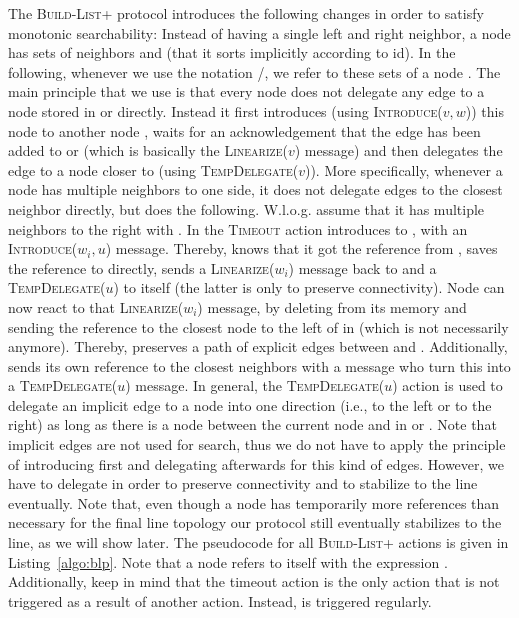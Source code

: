 \documentclass[a4paper,USenglish]{lipics}
\newcommand{\blp}{\textsc{Build-List+}\xspace}
\newcommand{\linearize}[1]{\textsc{Linearize(\ensuremath{#1})}\xspace}
\newcommand{\introduce}[1]{\textsc{Introduce(\ensuremath{#1})}\xspace}
\newcommand{\tempdelegate}[1]{\textsc{TempDelegate(\ensuremath{#1})}\xspace}
\newcommand{\timeout}{\textsc{Timeout}\xspace}
\begin{document}
The \blp protocol introduces the following changes in order to satisfy monotonic searchability:
Instead of having a single left and right neighbor, a node  has sets of neighbors  and  (that it sorts implicitly according to id).
In the following, whenever we use the notation /, we refer to these sets of a node .
The main principle that we use is that every node  does not delegate any edge to a node  stored in  or  directly.
Instead it first introduces (using \introduce{v,w}) this node to another node , waits for an acknowledgement that the edge has been added to  or  (which is basically the \linearize{v} message) and then delegates the edge to a node closer to  (using \tempdelegate{v}).
More specifically, whenever a node  has multiple neighbors to one side, it does not delegate edges to the closest neighbor directly, but does the following.
W.l.o.g. assume that it has multiple neighbors  to the right with .
In the \timeout action  introduces  to , with an \introduce{w_i,u} message.
Thereby,  knows that it got the reference from , saves the reference to  directly, sends a \linearize{w_i} message back to  and a \tempdelegate{u} to itself (the latter is only to preserve connectivity).
Node  can now react to that \linearize{w_i} message, by deleting  from its memory and sending the reference to the closest node to the left of  in  (which is not necessarily  anymore). 
Thereby,  preserves a path of explicit edges between  and .
Additionally,  sends its own reference to the closest neighbors with a  message who turn this into a \tempdelegate{u} message.
In general, the \tempdelegate{u} action is used to delegate an implicit edge to a node  into one direction (i.e., to the left or to the right) as long as there is a node between the current node and  in  or .
Note that implicit edges are not used for search, thus we do not have to apply the principle of introducing first and delegating afterwards for this kind of edges.
However, we have to delegate in order to preserve connectivity and to stabilize to the line eventually.
Note that, even though a node has temporarily more references than necessary for the final line topology our protocol still eventually stabilizes to the line, as we will show later.
The pseudocode for all \blp actions is given in Listing~\ref{algo:blp}.
Note that a node refers to itself with the expression .
Additionally, keep in mind that the timeout action is the only action that is not triggered as a result of another action.
Instead, is triggered regularly.
\end{document}
